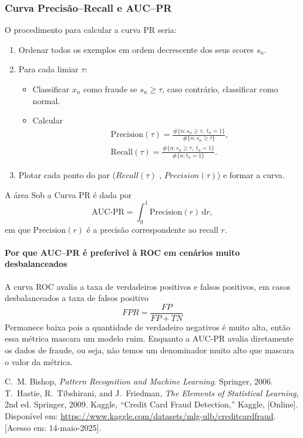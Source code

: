 \documentclass[conference]{IEEEtran}
\begin{document}
\subsubsection{Curva Precisão–Recall e AUC–PR}

O procedimento para calcular a curva PR seria:

\begin{enumerate}
  \item Ordenar todos os exemplos em ordem decrescente dos seus scores \(s_n\).
  \item Para cada limiar \(\tau\):
    \begin{itemize}
      \item Classificar \(x_n\) como fraude se \(s_n \ge \tau\), caso contrário, classificar como normal.
      \item Calcular
    \begin{align*}
        &\text{Precision}(\tau)
        = \frac{\#\{n : s_n \ge \tau,\; t_n=1\}}
               {\#\{n : s_n \ge \tau\}},\\
        &\text{Recall}(\tau)
        = \frac{\#\{n : s_n \ge \tau,\; t_n=1\}}
               {\#\{n : t_n=1\}}.
    \end{align*}
    \end{itemize}
  \item Plotar cada ponto do par ($Recall(\tau)$ , $Precision(\tau)$) e formar a curva.
\end{enumerate}

A área Sob a Curva PR é dada por
\[
  \mathrm{AUC\text{-}PR}
  = \int_{0}^{1} \! \text{Precision}(r)\,\mathrm{d}r,
\]
em que \(\text{Precision}(r)\) é a precisão correspondente ao recall \(r\).

\paragraph{Por que AUC–PR é preferível à ROC em cenários muito desbalanceados}
  A curva ROC avalia a taxa de verdadeiros positivos e falsos positivos, em casos desbalanceados a taxa de falsos positivo
  \[
  FPR = \frac{FP}{FP + TN}
  \]
  Permanece baixa pois a quantidade de verdadeiro negativos é muito alta, então essa métrica mascara um modelo ruim. Enquanto a AUC-PR avalia diretamente os dados de fraude, ou seja, não temos um denominador muito alto que mascara o valor da métrica. 



\begin{thebibliography}{9}
 C.~M. Bishop, \emph{Pattern Recognition and Machine Learning}. Springer, 2006.
 T.~Hastie, R.~Tibshirani, and J.~Friedman, \emph{The Elements of Statistical Learning}, 2nd ed. Springer, 2009.
 Kaggle, “Credit Card Fraud Detection,” Kaggle, [Online]. Disponível em: \url{https://www.kaggle.com/datasets/mlg-ulb/creditcardfraud}. [Acesso em: 14-maio-2025].
\end{thebibliography}
\appendix
\end{document}

